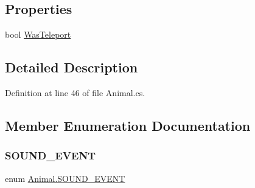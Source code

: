 \subsection*{Properties}
\begin{DoxyCompactItemize}
\item 
bool \mbox{\hyperlink{class_animal_a461c4f050bcad5e24677b05a80fbcaf4}{Was\+Teleport}}
\end{DoxyCompactItemize}


\subsection{Detailed Description}


Definition at line 46 of file Animal.\+cs.



\subsection{Member Enumeration Documentation}
\mbox{\label{class_animal_aa498775210af23df33eb0095e81ecbf7}} 
\subsubsection{\texorpdfstring{S\+O\+U\+N\+D\+\_\+\+E\+V\+E\+NT}{SOUND\_EVENT}}
{\footnotesize\ttfamily enum \mbox{\hyperlink{class_animal_aa498775210af23df33eb0095e81ecbf7}{Animal.\+S\+O\+U\+N\+D\+\_\+\+E\+V\+E\+NT}}\hspace{0.3cm}{\ttfamily [strong]}}

